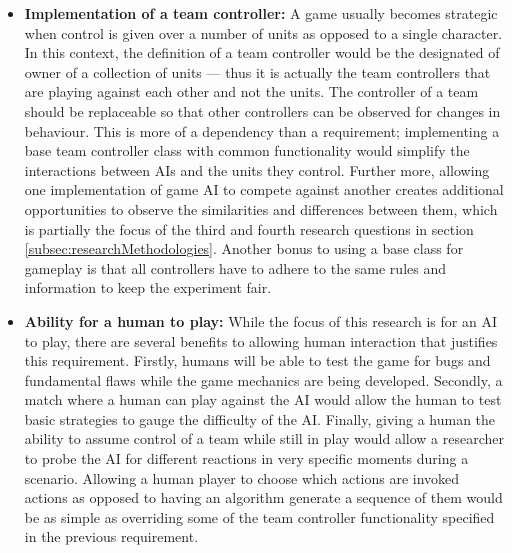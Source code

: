 \documentclass[11pt, a4paper]{report}
\begin{document}
\begin{itemize}
\item \textbf{Implementation of a team controller:}
A game usually becomes strategic when control is given over a number of units as opposed to a single character. In this context, the definition of a team controller would be the designated of owner of a collection of units --- thus it is actually the team controllers that are playing against each other and not the units. The controller of a team should be replaceable so that other controllers can be observed for changes in behaviour. This is more of a dependency than a requirement; implementing a base team controller class with common functionality would simplify the interactions between AIs and the units they control. Further more, allowing one implementation of game AI to compete against another creates additional opportunities to observe the similarities and differences between them, which is partially the focus of the third and fourth research questions in section \ref{subsec:researchMethodologies}. Another bonus to using a base class for gameplay is that all controllers have to adhere to the same rules and information to keep the experiment fair.

\item \textbf{Ability for a human to play:}
While the focus of this research is for an AI to play, there are several benefits to allowing human interaction that justifies this requirement. Firstly, humans will be able to test the game for bugs and fundamental flaws while the game mechanics are being developed. Secondly, a match where a human can play against the AI would allow the human to test basic strategies to gauge the difficulty of the AI. Finally, giving a human the ability to assume control of a team while still in play would allow a researcher to probe the AI for different reactions in very specific moments during a scenario. Allowing a human player to choose which actions are invoked actions as opposed to having an algorithm generate a sequence of them would be as simple as overriding some of the team controller functionality specified in the previous requirement.


\end{itemize}
\end{document}
